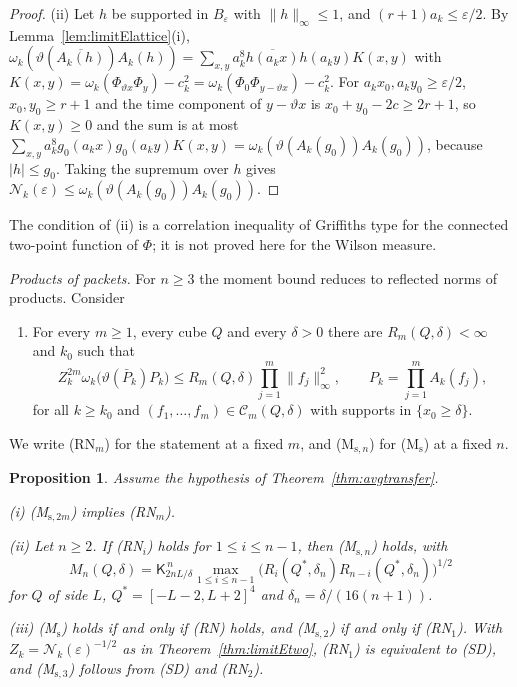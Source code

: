\documentclass[aps,prd,twocolumn,superscriptaddress,nofootinbib,longbibliography,floatfix,amsmath,amssymb,10pt]{revtex4-2}
\newtheorem{proposition}[theorem]{Proposition}
\theoremstyle{definition}
\theoremstyle{remark}
\begin{document}
\begin{proof}
(ii) Let $h$ be supported in $B_\varepsilon$ with $\|h\|_\infty\le1$, and
$(r+1)a_k\le\varepsilon/2$. By Lemma~\ref{lem:limitElattice}(i),
$\omega_k(\vartheta(\overline{A_k(h)})A_k(h))=\sum_{x,y}a_k^8\overline{h(a_k
x)}h(a_ky)K(x,y)$ with $K(x,y)=\omega_k(\Phi_{\vartheta x}\Phi_y)-c_k^2=
\omega_k(\Phi_0\Phi_{y-\vartheta x})-c_k^2$. For $a_kx_0,a_ky_0\ge
\varepsilon/2$, $x_0,y_0\ge r+1$ and the time component of $y-\vartheta x$
is $x_0+y_0-2c\ge2r+1$, so $K(x,y)\ge0$ and the sum is at most
$\sum_{x,y}a_k^8g_0(a_kx)g_0(a_ky)K(x,y)=\omega_k(\vartheta(A_k(g_0))
A_k(g_0))$, because $|h|\le g_0$. Taking the supremum over $h$ gives
$\mathcal N_k(\varepsilon)\le\omega_k(\vartheta(A_k(g_0))A_k(g_0))$.
\end{proof}

The condition of (ii) is a correlation inequality of Griffiths type for the
connected two-point function of $\Phi$; it is not proved here for the
Wilson measure.

\emph{Products of packets.} For $n\ge3$ the moment bound reduces to
reflected norms of products. Consider
\begin{enumerate}[label=\textup{(RN)},leftmargin=*]
\item For every $m\ge1$, every cube $Q$ and every $\delta>0$ there are
$R_m(Q,\delta)<\infty$ and $k_0$ such that
\[
Z_k^{2m}\omega_k\bigl(\vartheta(\bar P_k)P_k\bigr)\le R_m(Q,\delta)
\prod_{j=1}^m\|f_j\|_\infty^2,\qquad P_k=\prod_{j=1}^mA_k(f_j),
\]
for all $k\ge k_0$ and $(f_1,\dots,f_m)\in\mathcal C_m(Q,\delta)$ with
supports in $\{x_0\ge\delta\}$.
\end{enumerate}
We write (RN$_m$) for the statement at a fixed $m$, and (M$_{\mathrm s,n}$)
for (M$_{\mathrm s}$) at a fixed $n$.

\begin{proposition}\label{prop:limitEreflect}
Assume the hypothesis of Theorem~\textup{\ref{thm:avgtransfer}}.

\textup{(i)} \textup{(M$_{\mathrm s,2m}$)} implies \textup{(RN$_m$)}.

\textup{(ii)} Let $n\ge2$. If \textup{(RN$_i$)} holds for $1\le i\le n-1$, then
\textup{(M$_{\mathrm s,n}$)} holds, with
\[
M_n(Q,\delta)=\mathsf K_{2nL/\delta}^{\,n}\max_{1\le i\le n-1}\bigl(R_i(Q^*,
\delta_n)R_{n-i}(Q^*,\delta_n)\bigr)^{1/2}
\]
for $Q$ of side $L$, $Q^*=[-L-2,L+2]^4$ and $\delta_n=\delta/(16(n+1))$.

\textup{(iii)} \textup{(M$_{\mathrm s}$)} holds if and only if
\textup{(RN)} holds, and \textup{(M$_{\mathrm s,2}$)} if and only if
\textup{(RN$_1$)}. With $Z_k=\mathcal N_k(\varepsilon)^{-1/2}$ as in
Theorem~\textup{\ref{thm:limitEtwo}}, \textup{(RN$_1$)} is equivalent to
\textup{(SD)}, and \textup{(M$_{\mathrm s,3}$)} follows from \textup{(SD)}
and \textup{(RN$_2$)}.
\end{proposition}
\end{document}
